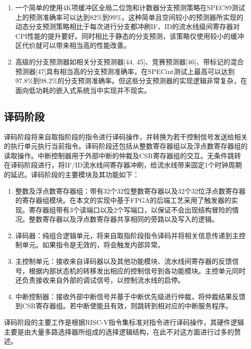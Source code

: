 \begin{enumerate}
	\item 一个简单的使用4K项缓冲区全局二位饱和计数器分支预测策略在SPEC89测试上的预测准确率可以达到82\%到99\%，这种简单且空间较小的预测器所实现的动态分支预测策略相比于每次进行分支都冲刷IF、ID的流水线级间寄存器对CPI性能的提升要好。同时相比于静态的分支预测，该策略仅使用较小的缓冲区代价就可以带来相当高的性能改善。
	\item 高级的分支预测器如相关分支预测器[44, 45]、竞赛预测器[46]、带标记的混合预测器[47]具有相当高的分支预测准确率，在SPECint测试上最高可以达到97.8\%到98.2\%的分支预测准确率。但这些分支预测器的实现逻辑非常复杂，在面向低功耗的嵌入式系统当中实现并不现实。
\end{enumerate}

\subsection{译码阶段}

译码阶段将来自取指阶段的指令进行译码操作，并转换为若干控制信号发送给相关的执行单元执行当前指令。译码阶段还包括从整数寄存器组以及浮点数寄存器组的读取操作。中断控制器用于外部中断的仲裁及CSR寄存器组的交互。无条件跳转在译码阶段进行，将IF/ID流水线间寄存器冲刷，给流水线带来固定1个时钟周期的延迟。译码阶段的主要模块及其功能如下：

\begin{enumerate}
	\item 整数及浮点数寄存器组：带有32个32位整数寄存器以及32个32位浮点数寄存器的寄存器组模块。在本文的实现中基于FPGA的后端工艺采用了触发器的实现。寄存器组带有3个读端口以及2个写端口，以保证不会出现结构冒险的情况。整数寄存器以及浮点数寄存器共享相同的旁路以及写入的逻辑。
	\item 译码器：纯组合逻辑单元，将来自取指阶段指令译码并将相关信息传递到主控制单元。如果指令是无效的，将会触发内部异常。
	\item 主控制单元：接收来自译码器以及其他功能模块、流水线间寄存器的反馈信号，根据内部状态机的转移发出相应的控制信号到各功能模块。主控单元同时还负责接收来自外部的调试信号，以控制流水线的启停。
	\item 中断控制器：接收外部中断信号并基于中断优先级进行仲裁，将仲裁结果反馈到CSR寄存器组。若中断使能且有效，则跳转到相对应的中断服务程序。
\end{enumerate}

译码阶段的主要工作是根据RISC-V指令集标准对指令进行译码操作，其硬件逻辑主要是由大量多路选择器所组成的选择逻辑结构，在此不对这方面进行过多的赘述。

